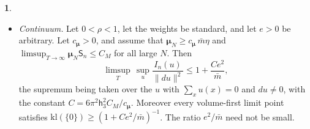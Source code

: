\documentclass[11pt]{amsart}
\newcommand{\namedhead}{}
\theoremstyle{definition}
\newtheorem*{namedinner}{\namedhead}
\newenvironment{named}[1]{\renewcommand{\namedhead}{#1}\begin{namedinner}}{\end{namedinner}}
\begin{document}
\begin{named}{Proposition 5.13}
\begin{itemize}
Then $\mathsf c_n\le C_1q^2/\mathbf m$, where $C_1=48\,\mathsf h_3^2C_0c_0'\bigl(1+c(2c_0/\mathsf h_3)\bigr)$.
\item[(e)] \emph{Continuum.}
Let $0<\rho<1$, let the weights be standard, and let $e>0$ be arbitrary.
Let $c_{\boldsymbol\mu}>0$, and assume that $\boldsymbol\mu_N\ge c_{\boldsymbol\mu}\,\bar m\eta$ and $\limsup_{T\to\infty}\boldsymbol\mu_N\mathsf S_n\le C_M$ for all large $N$.
Then
\begin{equation*}
\limsup_T\,\sup_u\frac{I_n(u)}{\|du\|^2}\le1+\frac{Ce^2}{\bar m},
\end{equation*}
the supremum being taken over the $u$ with $\sum_xu(x)=0$ and $du\ne0$, with the constant $C=6\pi^2\mathsf h_3^2C_M/c_{\boldsymbol\mu}$.
Moreover every volume-first limit point satisfies $\mathrm{kl}(\{0\})\ge(1+Ce^2/\bar m)^{-1}$.
The ratio $e^2/\bar m$ need not be small.
\end{itemize}
\end{named}
\end{document}
